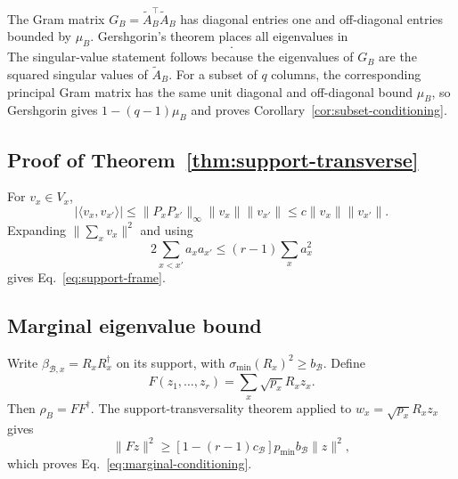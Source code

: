 The Gram matrix $G_B=\widetilde A_B^\top\widetilde A_B$ has diagonal entries one and off-diagonal entries bounded by $\mu_B$.  Gershgorin's theorem places all eigenvalues in
\begin{equation}
[1-(r-1)\mu_B,\,1+(r-1)\mu_B].
\end{equation}
The singular-value statement follows because the eigenvalues of $G_B$ are the squared singular values of $\widetilde A_B$.  For a subset of $q$ columns, the corresponding principal Gram matrix has the same unit diagonal and off-diagonal bound $\mu_B$, so Gershgorin gives $1-(q-1)\mu_B$ and proves Corollary~\ref{cor:subset-conditioning}.

\subsection{Proof of Theorem~\ref{thm:support-transverse}}
For $v_x\in V_x$,
\begin{equation}
|\langle v_x,v_{x'}\rangle|
\le\|P_xP_{x'}\|_\infty\|v_x\|\|v_{x'}\|
\le c\|v_x\|\|v_{x'}\|.
\end{equation}
Expanding $\|\sum_xv_x\|^2$ and using
\begin{equation}
2\sum_{x<x'}a_xa_{x'}\le(r-1)\sum_xa_x^2
\end{equation}
gives Eq.~\eqref{eq:support-frame}.

\subsection{Marginal eigenvalue bound}
Write $\beta_{\mathcal B,x}=R_xR_x^\dagger$ on its support, with $\sigma_{\min}(R_x)^2\ge b_{\mathcal B}$.  Define
\begin{equation}
F(z_1,\ldots,z_r)=\sum_x\sqrt{p_x}R_xz_x.
\end{equation}
Then $\rho_B=FF^\dagger$.  The support-transversality theorem applied to $w_x=\sqrt{p_x}R_xz_x$ gives
\begin{equation}
\|Fz\|^2\ge[1-(r-1)c_{\mathcal B}]p_{\min}b_{\mathcal B}\|z\|^2,
\end{equation}
which proves Eq.~\eqref{eq:marginal-conditioning}.

